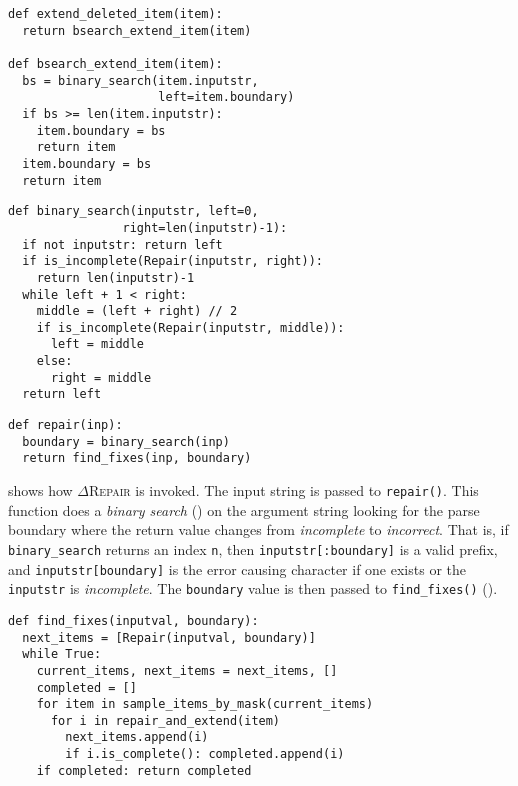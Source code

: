 \documentclass[acmsmall,screen,review,anonymous]{acmart}
\newcommand{\approach}{\textsc{$\Delta$Repair}\xspace}
\newcommand{\drepair}{\approach}
\def\<#1>{\texttt{#1}}
\begin{document}
\begin{lstlisting}[caption=Code for extending the boundary by performing binary search,label={lst:extenditem}]
def extend_deleted_item(item):
  return bsearch_extend_item(item)

def bsearch_extend_item(item):
  bs = binary_search(item.inputstr, 
                     left=item.boundary)
  if bs >= len(item.inputstr):
    item.boundary = bs
    return item
  item.boundary = bs
  return item
\end{lstlisting}
\vspace{\baselineskip}


\begin{lstlisting}[caption=Code showing the binary search that is performed at the beginning of the repair,label={lst:bsearch}]
def binary_search(inputstr, left=0, 
                right=len(inputstr)-1):
  if not inputstr: return left
  if is_incomplete(Repair(inputstr, right)):
    return len(inputstr)-1
  while left + 1 < right:
    middle = (left + right) // 2
    if is_incomplete(Repair(inputstr, middle)):
      left = middle
    else:
      right = middle
  return left
\end{lstlisting}
\vspace{\baselineskip}


\begin{lstlisting}[caption=\approach initial search,label={lst:drepair}]
def repair(inp):
  boundary = binary_search(inp)
  return find_fixes(inp, boundary)
\end{lstlisting}
\vspace{\baselineskip}

 shows how \drepair is invoked. The input string is passed to
\<repair()>.
This function does a \emph{binary search} () on the argument string looking for the parse boundary where the return value changes
from \emph{incomplete} to \emph{incorrect}. That is, if \<binary\_search>
returns an index \<n>, then \<inputstr[:boundary]> is a valid prefix, and
\<inputstr[boundary]> is the error causing character if one exists or the
\<inputstr> is \emph{incomplete}.
The \<boundary> value is then passed
to \<find\_fixes()> ().
\begin{lstlisting}[caption=find fixes,label={lst:findfixes}]
def find_fixes(inputval, boundary):
  next_items = [Repair(inputval, boundary)]
  while True:
    current_items, next_items = next_items, []
    completed = []
    for item in sample_items_by_mask(current_items)
      for i in repair_and_extend(item)
        next_items.append(i)
        if i.is_complete(): completed.append(i)
    if completed: return completed
\end{lstlisting}
\vspace{\baselineskip}
\end{document}
